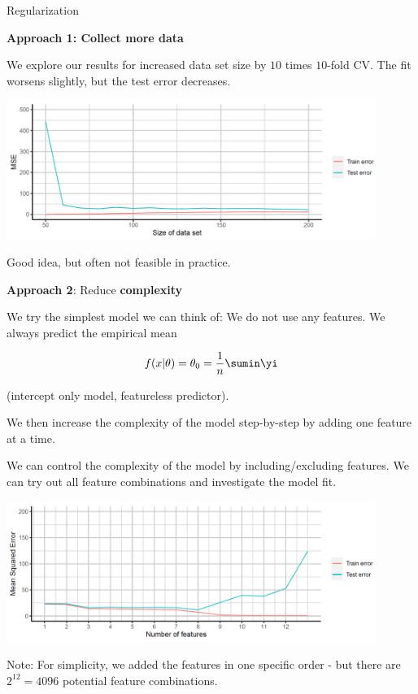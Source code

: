 \begin{vbframe}{Regularization}
\framebreak

\textbf{Approach 1: Collect more data}

We explore our results for increased data set size by \(10\) times
\(10\)-fold CV. The fit worsens slightly, but the test error decreases.

\vfill

\begin{center}
\includegraphics[width=0.9\textwidth]{plots/regularization02.png}
\end{center}


\vfill

Good idea, but often not feasible in practice.

\framebreak

\textbf{Approach 2}: Reduce \textbf{complexity}

We try the simplest model we can think of: We do not use any features.
We always predict the empirical mean

\[
f(x | \theta) = \theta_0 = \frac{1}{n}\sumin \yi
\]

(intercept only model, featureless predictor).

We then increase the complexity of the model step-by-step by adding one
feature at a time.

\framebreak

We can control the complexity of the model by including/excluding
features. We can try out all feature combinations and investigate the
model fit.

\vfill

\begin{center}
\includegraphics[width=0.9\textwidth]{plots/regularization03.png}
\end{center}

\vfill

Note: For simplicity, we added the features in one specific order - but there are $2^{12} = 4096$
potential feature combinations.

\end{vbframe}

